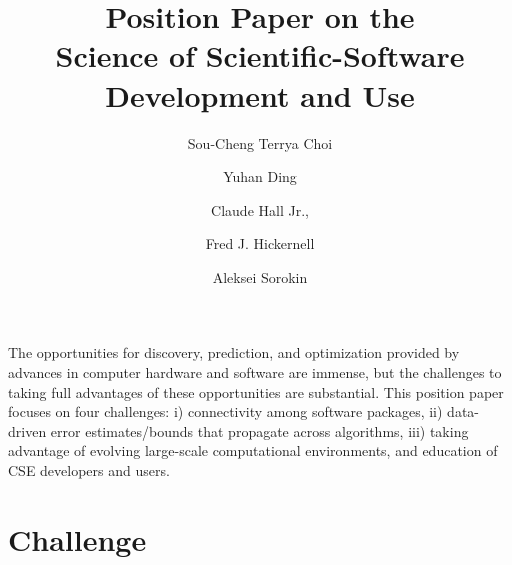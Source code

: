 \documentclass{amsart}
\begin{document}
\title{Position Paper on the \\ Science of Scientific-Software Development and Use}
\author{\vspace{-2ex}Sou-Cheng Terrya Choi}
\address[Choi, Ding, Hickernell, Sorokin]{Department of Applied Mathematics, RE 220, 10 W. 32nd St., Chicago, IL 60616}
\author{Yuhan Ding}
\author{Claude Hall Jr.,}
\address[Hall]{Birmingham Southern College, 900 Arkadelpha Rd, Birmingham, AL, 35254}
\author{Fred J. Hickernell}
\author{Aleksei Sorokin}


\maketitle

\vspace{-5ex}

The opportunities for discovery, prediction, and optimization provided by advances in computer hardware and software are immense, but the challenges to taking full advantages of these opportunities are substantial.  
This position paper focuses on four challenges: i) connectivity among software packages, ii) data-driven error estimates/bounds that propagate across algorithms, iii) taking advantage of evolving large-scale computational environments, and education of CSE developers and users.


\section{Challenge} %
\end{document}

